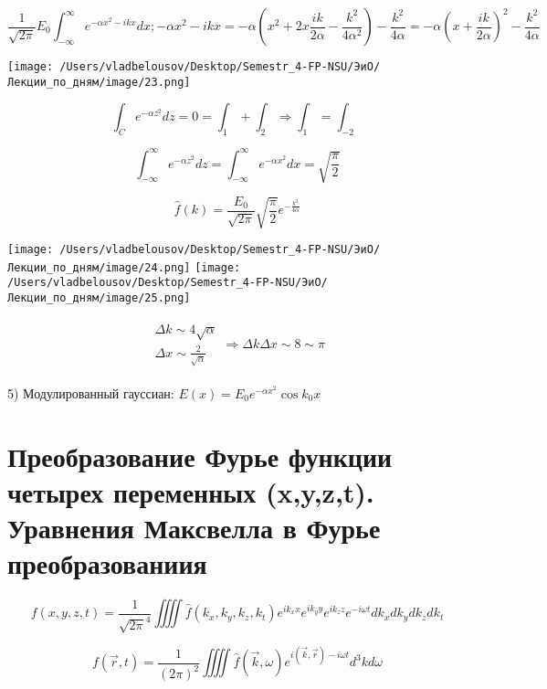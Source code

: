 \documentclass[12pt, a4paper]{report}
\begin{document}
\[ \frac{1}{\sqrt{2 \pi}}E_0 \int_{-\infty}^{\infty} e^{- \alpha x ^2 - ikx } dx ; -\alpha x ^2 - ikx = -\alpha \left( x ^2 + 2x \frac{ik}{2 \alpha} - \frac{k ^2}{4 \alpha ^2}   \right) - \frac{k ^2}{4\alpha} =  - \alpha \left( x + \frac{ik}{2\alpha} \right) ^2 - \frac{k ^2}{4\alpha}    \] 

\begin{center}
    \texttt{[image: /Users/vladbelousov/Desktop/Semestr\_4-FP-NSU/ЭиО/Лекции\_по\_дням/image/23.png]}
\end{center}

\[  \int_{C} e^{- \alpha z ^2 }dz = 0 = \int_{1} + \int_{ 2} \Rightarrow \int_{1} = \int _{-2}  \] 

\[ \int_{-\infty}^{\infty} e^{-\alpha z ^2 } dz = \int_{-\infty}^{\infty} e^{ - \alpha x ^2 } dx = \sqrt{\frac{\pi}{2} }    \] 

\[ \hat{f} (k) = \frac{ E_0}{\sqrt{2 \pi}} \sqrt{\frac{\pi}{2}} e^{- \frac{k ^2}{4 \alpha} }    \]

\begin{center}
    \texttt{[image: /Users/vladbelousov/Desktop/Semestr\_4-FP-NSU/ЭиО/Лекции\_по\_дням/image/24.png]}
    \texttt{[image: /Users/vladbelousov/Desktop/Semestr\_4-FP-NSU/ЭиО/Лекции\_по\_дням/image/25.png]}
\end{center}


\[\begin{aligned}
    \begin{array}{l}
        \Delta k \sim  4 \sqrt{\alpha} \\
        \Delta x \sim \frac{2}{\sqrt{\alpha}}
    \end{array}
    \Rightarrow 
    \Delta k \Delta x \sim 8 \sim \pi 
\end{aligned} \] 

5) Модулированный гауссиан: \( E(x) = E_0 e^{ - \alpha x ^2} \cos k_0x \) 

\section{Преобразование Фурье функции четырех переменных (x,y,z,t). Уравнения Максвелла в Фурье преобразованиия}

\[ f(x,y,z,t) = \frac{1}{\sqrt{ 2 \pi} ^4} \iiiint \hat{f}(k_x,k_y,k_z,k_t) e^{  i k_x x } e^{ i k_y y } e^{  i k_z z } e^{ - i \omega t } dk_x dk_y dk_z dk_t    \] 

\[ f( \vec{r},t) = \frac{1}{(2 \pi) ^2 } \iiiint \hat{f} ( \vec{k}, \omega) e^{ i( \vec{k},\vec{r})- i\omega t} d^3 k d \omega    \]  
\end{document}
